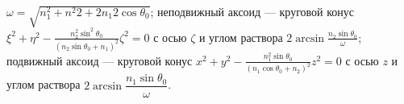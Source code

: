 $\omega=\sqrt{n^2_{1}+n^2{2}+2n_{1}{2}\cos\theta_{0}}$; неподвижный аксоид --- круговой конус
$\xi^2+\eta^2-\frac{n^2_{2}\sin^2\theta_{0}}{\left(n_{2}\sin\theta_{0}+n_{1}\right)^2}\zeta^2=0$ с осью $\zeta$ и углом раствора
$2\arcsin\frac{n_{2}\sin\theta_{0}}{\omega}$; подвижный аксоид --- круговой конус 
$x^2+y^2-\frac{n^2_{1}\sin\theta_{0}}{\left(n_{1}\cos\theta_{0}+n_{2}\right)^2}z^2=0$ с осью $z$ и углом раствора $2\arcsin\dfrac{n_{1}\sin\theta_{0}}{\omega}$.
